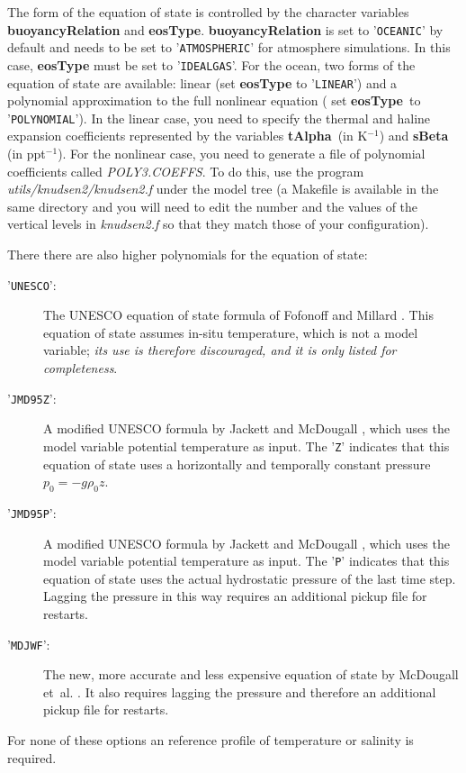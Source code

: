 The form of the equation of state is controlled by the character
variables \textbf{buoyancyRelation} and \textbf{eosType}.
\textbf{buoyancyRelation} is set to '\texttt{OCEANIC}' by default and
needs to be set to '\texttt{ATMOSPHERIC}' for atmosphere simulations.
In this case, \textbf{eosType} must be set to '\texttt{IDEALGAS}'.
For the ocean, two forms of the equation of state are available:
linear (set \textbf{eosType} to '\texttt{LINEAR}') and a polynomial
approximation to the full nonlinear equation ( set
\textbf{eosType}\textit{\ }to '\texttt{POLYNOMIAL}'). In the linear
case, you need to specify the thermal and haline expansion
coefficients represented by the variables \textbf{tAlpha}\textit{\ 
  }(in K$^{-1}$) and \textbf{sBeta} (in ppt$^{-1}$). For the nonlinear
case, you need to generate a file of polynomial coefficients called
\textit{POLY3.COEFFS}. To do this, use the program
\textit{utils/knudsen2/knudsen2.f} under the model tree (a Makefile is
available in the same directory and you will need to edit the number
and the values of the vertical levels in \textit{knudsen2.f} so that
they match those of your configuration).

There there are also higher polynomials for the equation of state:
\begin{description}
\item['\texttt{UNESCO}':] The UNESCO equation of state formula of
  Fofonoff and Millard \cite{fofonoff83}. This equation of state
  assumes in-situ temperature, which is not a model variable; \emph{its use
  is therefore discouraged, and it is only listed for completeness}.
\item['\texttt{JMD95Z}':] A modified UNESCO formula by Jackett and
  McDougall \cite{jackett95}, which uses the model variable potential
  temperature as input. The '\texttt{Z}' indicates that this equation
  of state uses a horizontally and temporally constant pressure
  $p_{0}=-g\rho_{0}z$. 
\item['\texttt{JMD95P}':] A modified UNESCO formula by Jackett and
  McDougall \cite{jackett95}, which uses the model variable potential
  temperature as input. The '\texttt{P}' indicates that this equation
  of state uses the actual hydrostatic pressure of the last time
  step. Lagging the pressure in this way requires an additional pickup
  file for restarts.
\item['\texttt{MDJWF}':] The new, more accurate and less expensive
  equation of state by McDougall et~al. \cite{mcdougall03}. It also
  requires lagging the pressure and therefore an additional pickup
  file for restarts.
\end{description}
For none of these options an reference profile of temperature or
salinity is required.

